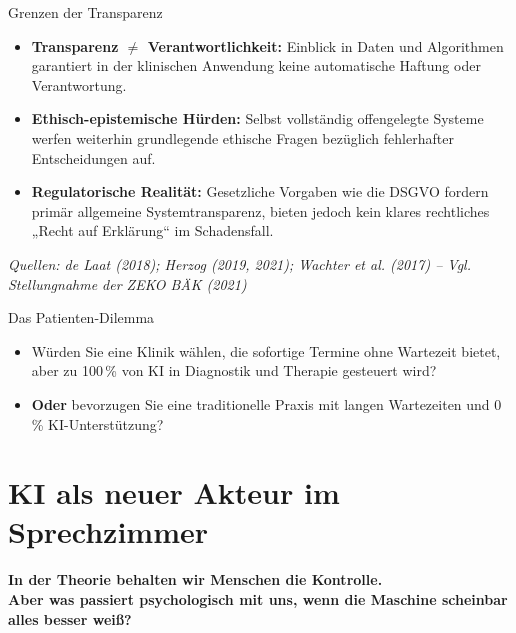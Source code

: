 \documentclass[aspectratio=169]{beamer}
\begin{document}
\begin{frame}{Grenzen der Transparenz}
    \begin{itemize}
        \item \textbf{Transparenz $\neq$ Verantwortlichkeit:} Einblick in Daten und Algorithmen garantiert in der klinischen Anwendung keine automatische Haftung oder Verantwortung.
        \item \textbf{Ethisch-epistemische Hürden:} Selbst vollständig offengelegte Systeme werfen weiterhin grundlegende ethische Fragen bezüglich fehlerhafter Entscheidungen auf.
        \item \textbf{Regulatorische Realität:} Gesetzliche Vorgaben wie die DSGVO fordern primär allgemeine Systemtransparenz, bieten jedoch kein klares rechtliches „Recht auf Erklärung“ im Schadensfall.
    \end{itemize}
    
    \vspace*{\fill}
    \tiny \textit{Quellen: de Laat (2018); Herzog (2019, 2021); Wachter et al. (2017) -- Vgl. Stellungnahme der ZEKO BÄK (2021)}
\end{frame}

\begin{frame}{Das Patienten-Dilemma}
    \begin{itemize}
        \item Würden Sie eine Klinik wählen, die sofortige Termine ohne Wartezeit bietet, aber zu 100\,\% von KI in Diagnostik und Therapie gesteuert wird?
        \item \textbf{Oder} bevorzugen Sie eine traditionelle Praxis mit langen Wartezeiten und 0\,\% KI-Unterstützung?
    \end{itemize}
\end{frame}


\section{KI als neuer Akteur im Sprechzimmer }

\begin{frame}{}

    \vspace{0.8cm}
    \begin{center}
        \textbf{\Large In der Theorie behalten wir Menschen die Kontrolle.} \\
        \vspace{0.4cm}
        \textbf{\Large Aber was passiert psychologisch mit uns, wenn die Maschine scheinbar alles besser weiß?}
    \end{center}
\end{frame}
\end{document}
